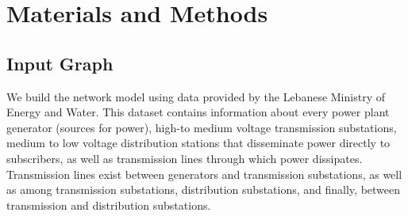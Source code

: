 
\section{Materials and Methods}
\label{methods}

\subsection{Input Graph}

We build the network model using data provided by the Lebanese Ministry of Energy and Water. This dataset contains information about every power plant generator (sources for power), high-to medium voltage transmission substations, medium to low voltage distribution stations that disseminate power directly to subscribers, as well as transmission lines through which power dissipates. Transmission lines exist between generators and transmission substations, as well as among transmission substations, distribution substations, and finally, between transmission and distribution substations. 


